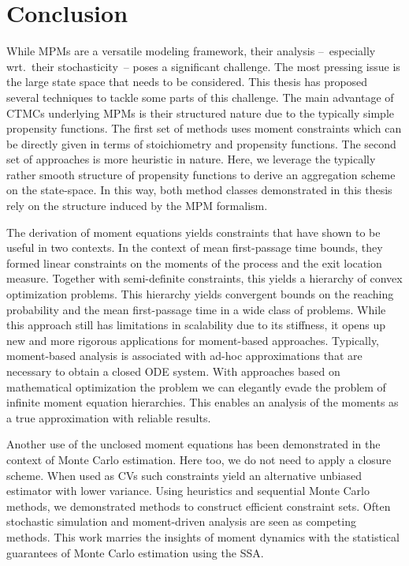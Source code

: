 \chapter{Conclusion}
While \aclp{MPM} are a versatile modeling framework, their analysis --~especially wrt.\ their stochasticity~-- poses a significant challenge.
The most pressing issue is the large state space that needs to be considered.
This thesis has proposed several techniques to tackle some parts of this challenge.
The main advantage of \acp{CTMC} underlying \acp{MPM} is their structured nature due to the typically simple propensity functions.
The first set of methods uses moment constraints which can be directly given in terms of stoichiometry and propensity functions.
The second set of approaches is more heuristic in nature.
Here, we leverage the typically rather smooth structure of propensity functions to derive an aggregation scheme on the state-space.
In this way, both method classes demonstrated in this thesis rely on the structure induced by the \ac{MPM} formalism.

The derivation of moment equations yields constraints that have shown to be useful in two contexts.
In the context of mean first-passage time bounds, they formed linear constraints on the moments of the process and the exit location measure.
Together with semi-definite constraints, this yields a hierarchy of convex optimization problems.
This hierarchy yields convergent bounds on the reaching probability and the mean first-passage time in a wide class of problems.
While this approach still has limitations in scalability due to its stiffness, it opens up new and more rigorous applications for moment-based approaches.
Typically, moment-based analysis is associated with ad-hoc approximations that are necessary to obtain a closed \ac{ODE} system.
With approaches based on mathematical optimization the problem we can elegantly evade the problem of infinite moment equation hierarchies.
This enables an analysis of the moments as a true approximation with reliable results.

Another use of the unclosed moment equations has been demonstrated in the context of Monte Carlo estimation.
Here too, we do not need to apply a closure scheme.
When used as \aclp{CV} such constraints yield an alternative unbiased estimator with lower variance.
Using heuristics and sequential Monte Carlo methods, we demonstrated methods to construct efficient constraint sets.
Often stochastic simulation and moment-driven analysis are seen as competing methods.
This work marries the insights of moment dynamics with the statistical guarantees of Monte Carlo estimation using the \ac{SSA}.

